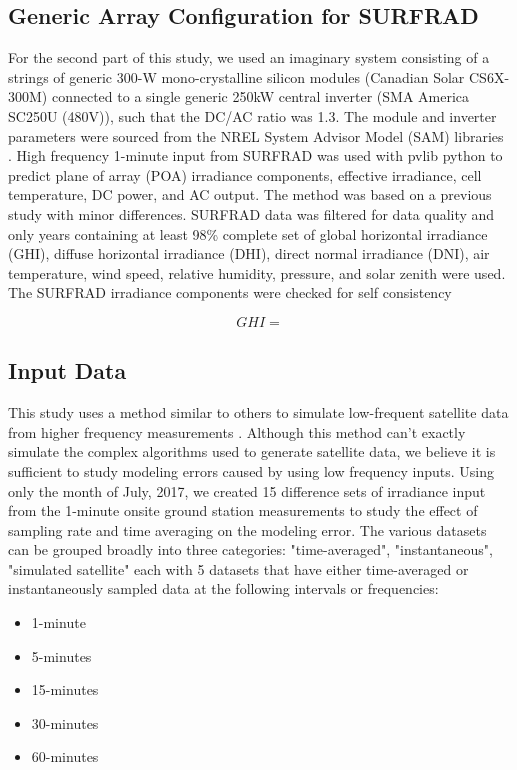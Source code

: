 \documentclass[conference]{IEEEtran}
\begin{document}
\subsection{Generic Array Configuration for SURFRAD}
For the second part of this study, we used an imaginary system consisting of a strings of generic 300-W mono-crystalline silicon modules (Canadian Solar CS6X-300M) connected to a single generic 250kW central inverter (SMA America SC250U (480V)), such that the DC/AC ratio was 1.3. The module and inverter parameters were sourced from the NREL System Advisor Model (SAM) libraries \cite{Freeman2018}. High frequency 1-minute input from SURFRAD \cite{Augustine2000} was used with pvlib python \cite{pvlib2018} to predict plane of array (POA) irradiance components, effective irradiance, cell temperature, DC power, and AC output. The method was based on a previous study \cite{9519024} with minor differences. SURFRAD data was filtered for data quality and only years containing at least 98\% complete set of global horizontal irradiance (GHI), diffuse horizontal irradiance (DHI), direct normal irradiance (DNI), air temperature, wind speed, relative humidity, pressure, and solar zenith were used. The SURFRAD irradiance components were checked for self consistency 

\begin{equation}
GHI = 
\end{equation}


\subsection{Input Data}
This study uses a method similar to others to simulate low-frequent satellite data from higher frequency measurements \cite{Bowersox2021}. Although this method can't exactly simulate the complex algorithms used to generate satellite data, we believe it is sufficient to study modeling errors caused by using low frequency inputs. Using only the month of July, 2017, we created 15 difference sets of irradiance input from the 1-minute onsite ground station measurements to study the effect of sampling rate and time averaging on the modeling error. The various datasets can be grouped broadly into three categories: "time-averaged", "instantaneous", "simulated satellite" each with 5 datasets that have either time-averaged or instantaneously sampled data at the following intervals or frequencies:

\begin{itemize}
    \item 1-minute
    \item 5-minutes
    \item 15-minutes
    \item 30-minutes
    \item 60-minutes
\end{itemize}
\end{document}
